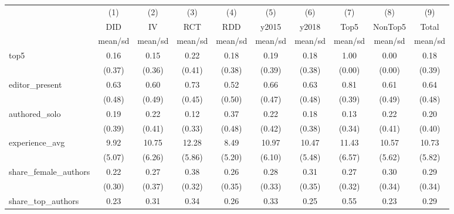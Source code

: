 {
\def\sym#1{\ifmmode^{#1}\else\(^{#1}\)\fi}
\begin{tabular}{l*{9}{c}}
\hline\hline
            &\multicolumn{1}{c}{(1)}&\multicolumn{1}{c}{(2)}&\multicolumn{1}{c}{(3)}&\multicolumn{1}{c}{(4)}&\multicolumn{1}{c}{(5)}&\multicolumn{1}{c}{(6)}&\multicolumn{1}{c}{(7)}&\multicolumn{1}{c}{(8)}&\multicolumn{1}{c}{(9)}\\
            &\multicolumn{1}{c}{DID}&\multicolumn{1}{c}{IV}&\multicolumn{1}{c}{RCT}&\multicolumn{1}{c}{RDD}&\multicolumn{1}{c}{y2015}&\multicolumn{1}{c}{y2018}&\multicolumn{1}{c}{Top5}&\multicolumn{1}{c}{NonTop5}&\multicolumn{1}{c}{Total}\\
            &     mean/sd&     mean/sd&     mean/sd&     mean/sd&     mean/sd&     mean/sd&     mean/sd&     mean/sd&     mean/sd\\
\hline
top5        &        0.16&        0.15&        0.22&        0.18&        0.19&        0.18&        1.00&        0.00&        0.18\\
            &      (0.37)&      (0.36)&      (0.41)&      (0.38)&      (0.39)&      (0.38)&      (0.00)&      (0.00)&      (0.39)\\
editor\_present&        0.63&        0.60&        0.73&        0.52&        0.66&        0.63&        0.81&        0.61&        0.64\\
            &      (0.48)&      (0.49)&      (0.45)&      (0.50)&      (0.47)&      (0.48)&      (0.39)&      (0.49)&      (0.48)\\
authored\_solo&        0.19&        0.22&        0.12&        0.37&        0.22&        0.18&        0.13&        0.22&        0.20\\
            &      (0.39)&      (0.41)&      (0.33)&      (0.48)&      (0.42)&      (0.38)&      (0.34)&      (0.41)&      (0.40)\\
experience\_avg&        9.92&       10.75&       12.28&        8.49&       10.97&       10.47&       11.43&       10.57&       10.73\\
            &      (5.07)&      (6.26)&      (5.86)&      (5.20)&      (6.10)&      (5.48)&      (6.57)&      (5.62)&      (5.82)\\
share\_female\_authors&        0.22&        0.27&        0.38&        0.26&        0.28&        0.31&        0.27&        0.30&        0.29\\
            &      (0.30)&      (0.37)&      (0.32)&      (0.35)&      (0.33)&      (0.35)&      (0.32)&      (0.34)&      (0.34)\\
share\_top\_authors&        0.23&        0.31&        0.34&        0.26&        0.33&        0.25&        0.55&        0.23&        0.29\\

\end{tabular}}
